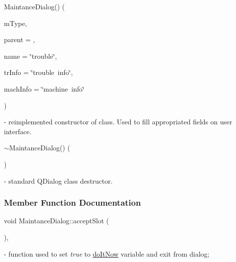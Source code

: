 \mbox{\label{classMaintanceDialog_adce1e1f1bf5989b01784faf777b8a40e}} 
{\footnotesize\ttfamily \texorpdfstring{Maintance\+Dialog()}{MaintanceDialog()}\hspace{0.1cm}{\footnotesize\ttfamily [2/2]} (\begin{DoxyParamCaption}\item[{\mbox{\hyperlink{classMaintanceDialog_a0774fde5cbe916c333d8d1dd991a3b8f}{Maintance\+Dialog\+::\+Maintance\+Type}}}]{m\+Type,  }\item[{Q\+Widget $\ast$}]{parent = {},  }\item[{Q\+String}]{name = {\ttfamily \char`\"{}trouble\char`\"{}},  }\item[{Q\+String}]{tr\+Info = {\ttfamily \char`\"{}trouble~info\char`\"{}},  }\item[{Q\+String}]{mach\+Info = {\ttfamily \char`\"{}machine~info\char`\"{}} }\end{DoxyParamCaption})\hspace{0.3cm}{\ttfamily [explicit]}} - reimplemented constructor of class. Used to fill appropriated fields on user interface. 

\mbox{\label{classMaintanceDialog_a96b4b3c7702a5a3fb51c7d5327cb82e1}} 
{\footnotesize\ttfamily \texorpdfstring{$\sim$\+Maintance\+Dialog()}{~MaintanceDialog()} 
(\begin{DoxyParamCaption}{ }\end{DoxyParamCaption})} - standard Q\+Dialog class destructor.



\subsubsection{Member Function Documentation}
\mbox{\label{classMaintanceDialog_a3453a9ed317177d9bf8fb4be6bfa9de6}} 
{\footnotesize\ttfamily void Maintance\+Dialog\+::\texorpdfstring{accept\+Slot}{acceptSlot} (\begin{DoxyParamCaption}{ }\end{DoxyParamCaption})\hspace{0.3cm}{\ttfamily [private]}, {\ttfamily [slot]}} - function used to set \textit{true} to \hyperlink{classMaintanceDialog_ae23009895f32bfffb43f5ed93188be45}{do\+It\+Now} variable and exit from dialog;


